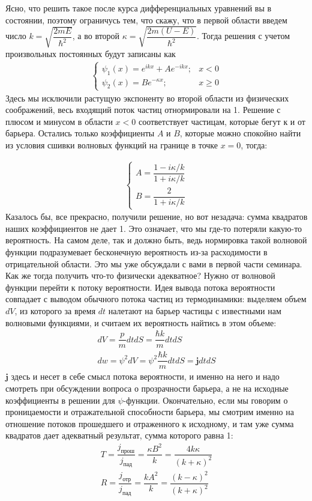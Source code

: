 \documentclass[12pt]{article}
\begin{document}
\noindent
Ясно, что решить такое после курса дифференциальных уравнений вы в состоянии\vspace{2mm}, поэтому ограничусь тем, что скажу, что в первой области введем число $k = \sqrt{\dfrac{2mE}{\hbar^2}}$, а во второй $ \kappa = \sqrt{\dfrac{2m(U -E)}{\hbar^2}}$. Тогда решения с учетом произвольных постоянных будут записаны как
\begin{gather*}
    \begin{cases}
         \psi_1(x) = e^{ikx} + A e^{-ikx}; &x<0  \\
         \psi_2(x) = Be^{-\kappa x}; &x\ge 0  
    \end{cases}
\end{gather*}
Здесь мы исключили растущую экспоненту во второй области из физических соображений, весь входящий поток частиц отнормировали на 1. Решение с плюсом и минусом в области $x<0$ соответствует частицам, которые бегут к и от барьера. Остались только коэффициенты $A$ и $B$, которые можно спокойно найти из условия сшивки волновых функций на границе в точке $x=0$, тогда:

\begin{gather*}
    \begin{cases}
        A = \dfrac{1 - i\kappa/k}{1 + i\kappa/k}\\[5pt]
        B = \dfrac{2}{1 + i\kappa/k}
    \end{cases}
\end{gather*}
Казалось бы, все прекрасно, получили решение, но вот незадача: сумма квадратов наших коэффициентов не дает 1. Это означает, что мы где-то потеряли какую-то вероятность. На самом деле, так и должно быть, ведь нормировка такой волновой функции подразумевает бесконечную вероятность из-за расходимости в отрицательной области. Это мы уже обсуждали с вами в первой части семинара. Как же тогда получить что-то физически адекватное? Нужно от волновой функции перейти к потоку вероятности. Идея вывода потока вероятности совпадает с выводом обычного потока частиц из термодинамики: выделяем объем $dV$, из которого за время $dt$ налетают на барьер частицы с известными нам волновыми функциями, и считаем их вероятность найтись в этом объеме:
\begin{gather*}
    dV = \dfrac{p}{m}dtdS = \dfrac{\hbar k}{m}dtdS\\
    dw = \psi^2dV = \psi^2\dfrac{\hbar k}{m}dtdS = \textbf{j}dtdS
\end{gather*}
$\textbf{j}$ здесь и несет в себе смысл потока вероятности,  и именно на него и надо смотреть при обсуждении вопроса о прозрачности барьера, а не на исходные коэффициенты в решении для $\psi$-функции. Окончательно, если мы говорим о проницаемости и отражательной способности барьера, мы смотрим именно на отношение потоков прошедшего и отраженного к исходному, и там уже сумма квадратов дает адекватный результат, сумма которого равна 1:
\begin{gather*}
    T = \dfrac{j_{\text{прош}}}{j_{\text{пад}}} = \dfrac{\kappa B^2}{k} = \dfrac{4k\kappa}{(k+\kappa)^2} \\
    R = \dfrac{j_{\text{отр}}}{j_{\text{пад}}} = \dfrac{k A^2}{k} = \dfrac{(k-\kappa)^2}{(k+\kappa)^2}
\end{gather*}
\end{document}
